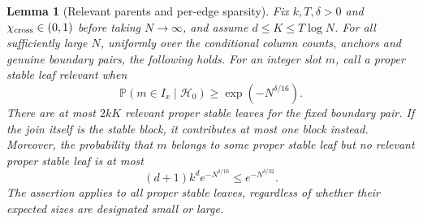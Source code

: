 \documentclass[11pt]{article}
\numberwithin{equation}{section}
\newtheorem{lemma}[lemma]{Lemma}
\newcommand{\Pp}{\mathbb P}
\newcommand{\1}{\mathbf 1}
\begin{document}
\begin{lemma}[Relevant parents and per-edge sparsity]
\label{lem:ub-anchor-relevant-parents}
Fix $k,T,\delta>0$ and $\chi_{\rm cross}\in(0,1)$ before taking
$N\to\infty$, and assume $d\le K\le T\log N$.
For all sufficiently large $N$, uniformly over the conditional
column counts, anchors and genuine boundary pairs, the following
holds.  For an integer slot $m$, call a proper stable leaf relevant
when
\begin{equation}
\label{eq:ub-anchor-relevance-threshold}
 \Pp(m\in I_x\mid\mathcal H_0)
       \ge\exp(-N^{\delta/16}).
\end{equation}
There are at most $2kK$ relevant proper stable leaves for the fixed
boundary pair.  If the join itself is the stable block, it contributes
at most one block instead.  Moreover, the probability that $m$
belongs to some proper stable leaf but no relevant proper stable
leaf is at most
\begin{equation}
\label{eq:ub-anchor-irrelevant-loss}
 (d+1)k^d e^{-N^{\delta/16}}
 \le e^{-N^{\delta/32}}.
\end{equation}
The assertion applies to all proper stable leaves, regardless of
whether their expected sizes are designated small or large.
\end{lemma}
\end{document}
